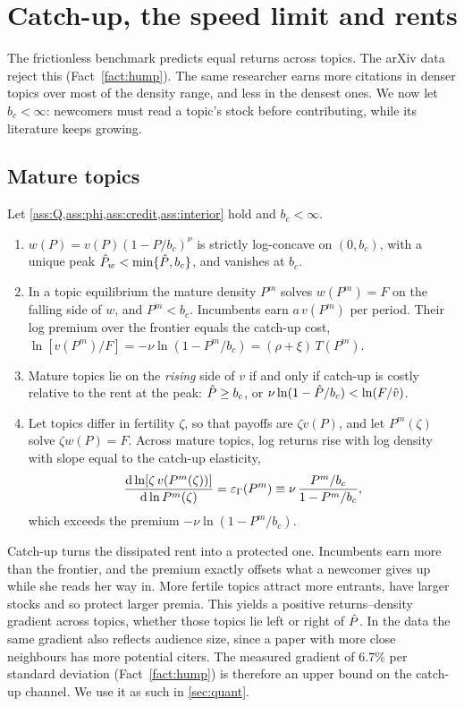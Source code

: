 \section{Catch-up, the speed limit and rents}\label{sec:catchup}

The frictionless benchmark predicts equal returns across topics. The arXiv data
reject this (Fact~\ref{fact:hump}). The same researcher earns more citations in
denser topics over most of the density range, and less in the densest ones. We
now let $b_c<\infty$: newcomers must read a topic's stock before contributing,
while its literature keeps growing.

\subsection{Mature topics}

\begin{proposition}\label{prop:mature}
Let \cref{ass:Q,ass:phi,ass:credit,ass:interior} hold and $b_c<\infty$.
\begin{enumerate}[label=(\roman*)]
\item $w(P)=v(P)(1-P/b_c)^\nu$ is strictly log-concave on $(0,b_c)$, with a unique peak $\hat P_w<\min\{\hat P,b_c\}$, and vanishes at $b_c$.
\item In a topic equilibrium the mature density $P^m$ solves $w(P^m)=F$ on the falling side of $w$, and $P^m<b_c$. Incumbents earn $a\,v(P^m)$ per period. Their log premium over the frontier equals the catch-up cost, $\ln[v(P^m)/F]=-\nu\ln(1-P^m/b_c)=(\rho+\xi)\,T(P^m)$.
\item Mature topics lie on the \emph{rising} side of $v$ if and only if catch-up is costly relative to the rent at the peak: $\hat P\ge b_c$, or $\nu\ln(1-\hat P/b_c)<\ln(F/\hat v)$.
\item Let topics differ in fertility $\zeta$, so that payoffs are $\zeta v(P)$, and let $P^m(\zeta)$ solve $\zeta w(P)=F$. Across mature topics, log returns rise with log density with slope equal to the catch-up elasticity,
\[
\frac{\mathrm{d}\ln[\zeta\,v(P^m(\zeta))]}{\mathrm{d}\ln P^m(\zeta)}=\varepsilon_\Gamma(P^m)\equiv\nu\,\frac{P^m/b_c}{1-P^m/b_c},
\]
which exceeds the premium $-\nu\ln(1-P^m/b_c)$.
\end{enumerate}
\end{proposition}

Catch-up turns the dissipated rent into a protected one. Incumbents earn more
than the frontier, and the premium exactly offsets what a newcomer gives up
while she reads her way in. More fertile topics attract more entrants, have
larger stocks and so protect larger premia. This yields a positive
returns--density gradient across topics, whether those topics lie left or
right of $\hat P$. In the data the same gradient also reflects audience size,
since a paper with more close neighbours has more potential citers. The
measured gradient of 6.7\% per standard deviation (Fact~\ref{fact:hump}) is
therefore an upper bound on the catch-up channel. We use it as such in
\cref{sec:quant}.

